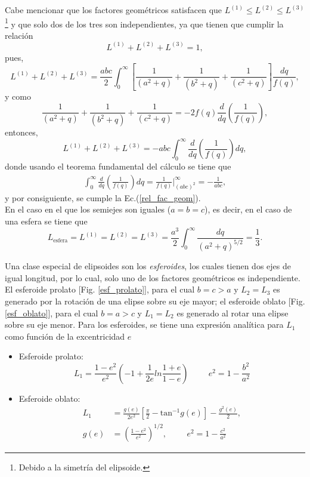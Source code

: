 \noindent Cabe mencionar que los factores geométricos  satisfacen que $L^{(1)}\leq L^{(2)}\leq L^{(3)}$\footnote{Debido a la simetría del elipsoide.} y que solo dos de los tres son independientes, ya que tienen que cumplir la relación 
\begin{equation}
    L^{(1)}+L^{(2)}+L^{(3)}=1,
    \label{rel_fac_geom}
\end{equation}
pues, 
\begin{equation*}
	L^{(1)}+L^{(2)}+L^{(3)}=\frac{abc}{2}\int_0^{\infty}\left[\frac{1}{(a^2+q)}+\frac{1}{(b^2+q)}+\frac{1}{(c^2+q)}\right]\frac{dq}{f(q)},
\end{equation*}
y como
$$\frac{1}{(a^2+q)}+\frac{1}{(b^2+q)}+\frac{1}{(c^2+q)}=-2 f(q)\frac{d}{dq}\left(\frac{1}{f(q)}\right),$$
entonces,
$$L^{(1)}+L^{(2)}+L^{(3)}=-abc\int_0^{\infty}\frac{d}{dq}\left(\frac{1}{f(q)}\right)dq,$$
donde usando el teorema fundamental del cálculo se tiene que
\begin{align*}
	\int_0^{\infty}\frac{d}{dq}\left(\frac{1}{f(q)}\right)dq=\frac{1}{f(q)}\Big|_{(abc)^2}^{\infty}=-\frac{1}{abc},
\end{align*}
y por consiguiente, se cumple la Ec.(\ref{rel_fac_geom}).\\

\noindent En el caso en el que los semiejes son iguales ($a=b=c$), es decir, en el caso de una esfera se tiene que
\begin{equation*}
    L_{\text{esfera}}=L^{(1)}=L^{(2)}=L^{(3)}=\frac{a^3}{2}\int_0^{\infty}\frac{dq}{(a^2+q)^{5/2}}=\frac{1}{3}.
\end{equation*}

Una clase especial de elipsoides son los \textit{esferoides}, los cuales tienen dos ejes de igual longitud, por lo cual, solo uno de los factores geométricos es independiente. El esferoide prolato [Fig. \ref{esf_prolato}], para el cual $b=c>a$ y $L_2=L_3$ es generado por la rotación de una elipse sobre su eje mayor; el esferoide oblato [Fig.\ref{esf_oblato}], para el cual $b=a>c$ y $L_1=L_2$ es generado al rotar una elipse sobre su eje menor. Para los esferoides, se tiene una expresión analítica para $L_1$ como función de la excentricidad $e$ \cite{Bohren}
\begin{itemize}
    \item Esferoide prolato:
    \begin{equation}
        L_1=\frac{1-e^2}{e^2}\left(-1+\frac{1}{2e}ln\frac{1+e}{1-e}\right)\hspace{1cm}e^2=1-\frac{b^2}{a^2}
    \end{equation}
    \item Esferoide oblato:
    \begin{align}
        L_1&=\frac{g(e)}{2e^2}\left[\frac{\pi}{2}-\mbox{tan}^{-1}g(e)\right]-\frac{g^2(e)}{2},\\
        g(e)&=\left(\frac{1-e^2}{e^2}\right)^{1/2},\hspace{1cm}e^2=1-\frac{c^2}{a^2}
    \end{align}
\end{itemize}

